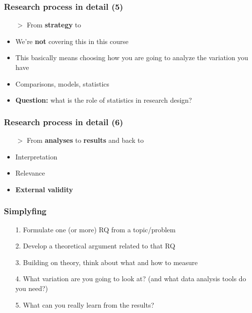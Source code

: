 \documentclass[aspectratio=43]{beamer}
\begin{document}
\begin{frame}
\frametitle{Research process in detail (5)}
\centering

\begin{itemize}
  \item[$>$] From \textbf{strategy} to 
  \item[]
  \item We're \textbf{not} covering this in this course
  \item This basically means choosing how you are going to analyze the variation you have
  \item Comparisons, models, statistics
  \item \textbf{Question:} what is the role of statistics in research design?
\end{itemize}

\end{frame}

\begin{frame}
\frametitle{Research process in detail (6)}
\centering

\begin{itemize}
  \item[$>$] From \textbf{analyses} to \textbf{results} and back to 
  \item[]
  \item Interpretation
  \item Relevance
  \item \textbf{External validity}
\end{itemize}

\end{frame}

\begin{frame}
\frametitle{Simplyfing}
\centering

\begin{itemize}
  \item[1.] Formulate one (or more) RQ from a topic/problem
  \item[2.] Develop a theoretical argument related to that RQ
  \item[3.] Building on theory, think about what and how to measure
  \item[4.] What variation are you going to look at? (and what data analysis tools do you need?)
  \item[5.] What can you really learn from the results?
\end{itemize}

\end{frame}
\end{document}
